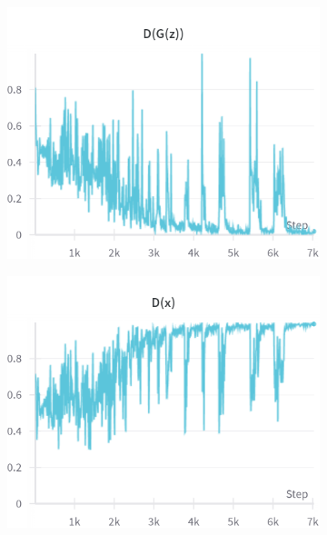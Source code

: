\begin{figure}[H]
    \begin{subfigure}{0.45\textwidth}
        \centering
        \includegraphics[width=0.95\linewidth]{ngf/128/D_G_z.png}
        \caption{}
        \label{subfig:ngf/128/D_G_z}
    \end{subfigure}%
    \begin{subfigure}{0.45\textwidth}
        \centering
        \includegraphics[width=0.95\linewidth]{ngf/128/D_x.png}
        \caption{}
        \label{subfig:ngf/128/D_x}
    \end{subfigure}


\end{figure}
